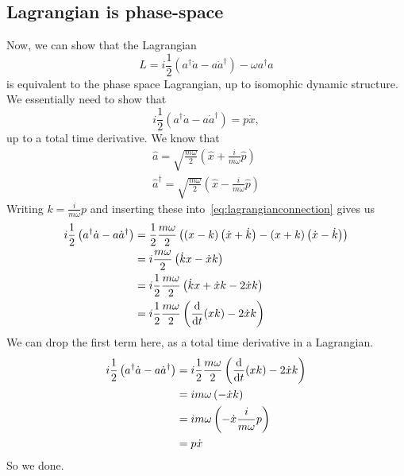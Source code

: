 \documentclass{article}
\begin{document}
	\subsection{Lagrangian is phase-space} \label{subsec:lagrangianphasespace}
	Now, we can show that the Lagrangian
	\begin{equation}
		L = i\frac12 \left(a^\dagger \dot{a} - a \dot{a}^\dagger \right) - \omega a^\dagger a
	\end{equation}
	is equivalent to the phase space Lagrangian, up to isomophic dynamic structure.
	We essentially need to show that
	\begin{equation}
		i\frac12 \left(a^\dagger \dot{a} - a \dot{a}^\dagger \right) = p \dot{x}, \label{eq:lagrangianconnection}
	\end{equation}
	up to a total time derivative.
	We know that
	\begin{align}
		\hat{a} = \sqrt{\frac{m \omega}{2}} \left(\hat{x} + \frac{i}{m \omega} \hat{p} \right) \\
		\hat{a}^\dagger = \sqrt{\frac{m \omega}{2}} \left(\hat{x} - \frac{i}{m \omega} \hat{p} \right)
	\end{align}
	Writing $k = \frac{i}{m \omega} p$ and inserting these into~\eqref{eq:lagrangianconnection} gives us
	\begin{align}
		i\frac12 \left(a^\dagger \dot{a} - a \dot{a}^\dagger \right) &= \frac12 \frac{m \omega}{2} \left( \left( x - k \right)\left(\dot{x} + \dot{k} \right) - \left(x + k \right) \left(\dot{x} - \dot{k} \right)\right) \\
		&= i  \frac{m \omega}{2} \left( \dot{k} x - \dot{x} k \right) \\
		&= i \frac12 \frac{m \omega}{2} \left( \dot{k} x + \dot{x} k - 2 \dot{x} k \right) \\
		&= i \frac12 \frac{m \omega}{2} \left( \dv{t}(xk) - 2 \dot{x} k \right)
	\end{align}
	We can drop the first term here, as a total time derivative in a Lagrangian.
	\begin{align}
		i\frac12 \left(a^\dagger \dot{a} - a \dot{a}^\dagger \right) &= i \frac12 \frac{m \omega}{2} \left( \dv{t}(xk) - 2 \dot{x} k \right) \\
		&= i m \omega \left( - \dot{x} k \right) \\
		&= i m \omega \left( - \dot{x} \frac{i}{m \omega} p \right) \\
		&= p \dot{x}
	\end{align}
	So we done.
\end{document}
